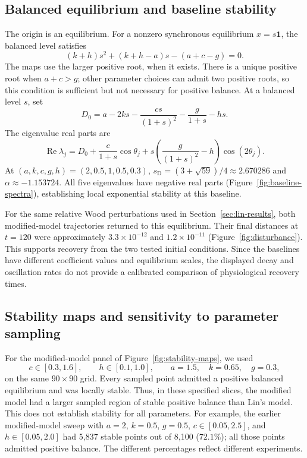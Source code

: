 \subsection{Balanced equilibrium and baseline stability}
\label{sec:modified-stability}
The origin is an equilibrium. For a nonzero synchronous equilibrium
$x=s\mathbf{1}$, the balanced level satisfies
\begin{equation}
 (k+h)s^2+(k+h-a)s-(a+c-g)=0.
 \label{eq:modified-balance}
\end{equation}
The maps use the larger positive root, when it exists. There is a unique
positive root when $a+c>g$; other parameter choices can admit two positive
roots, so this condition is sufficient but not necessary for positive
balance. At a balanced level $s$, set
\[
 D_0=a-2ks-\frac{cs}{(1+s)^2}-\frac{g}{1+s}-hs.
\]
The eigenvalue real parts are
\begin{equation}
 \operatorname{Re}\lambda_j
 =D_0+\frac{c}{1+s}\cos\theta_j
       +s\left(\frac{g}{(1+s)^2}-h\right)\cos(2\theta_j).
 \label{eq:modified-spectrum}
\end{equation}
At $(a,k,c,g,h)=(2,0.5,1,0.5,0.3)$,
$s_{\mathrm D}=(3+\sqrt{59})/4\approx2.670286$ and
$\alpha\approx-1.153724$. All five eigenvalues have negative real parts
(Figure~\ref{fig:baseline-spectra}), establishing local exponential
stability at this baseline.

For the same relative Wood perturbations used in
Section~\ref{sec:lin-results}, both modified-model trajectories returned
to this equilibrium. Their final distances at $t=120$ were approximately
$3.3\times10^{-12}$ and $1.2\times10^{-11}$
(Figure~\ref{fig:disturbance}). This supports recovery from the two tested
initial conditions. Since the baselines have different coefficient values
and equilibrium scales, the displayed decay and oscillation rates do not
provide a calibrated comparison of physiological recovery times.

\subsection{Stability maps and sensitivity to parameter sampling}
For the modified-model panel of Figure~\ref{fig:stability-maps}, we used
\begin{equation}
 c\in[0.3,1.6],\qquad h\in[0.1,1.0],\qquad
 a=1.5,\quad k=0.65,\quad g=0.3,
 \label{eq:modified-sweep}
\end{equation}
on the same $90\times90$ grid. Every sampled point admitted a positive
balanced equilibrium and was locally stable. Thus, in these specified
slices, the modified model had a larger sampled region of stable positive
balance than Lin's model. This does not establish stability for all
parameters. For example, the earlier modified-model sweep with
$a=2$, $k=0.5$, $g=0.5$, $c\in[0.05,2.5]$, and $h\in[0.05,2.0]$
had 5,837 stable points out of 8,100 ($72.1\%$); all those points admitted
positive balance. The different percentages reflect different experiments.

